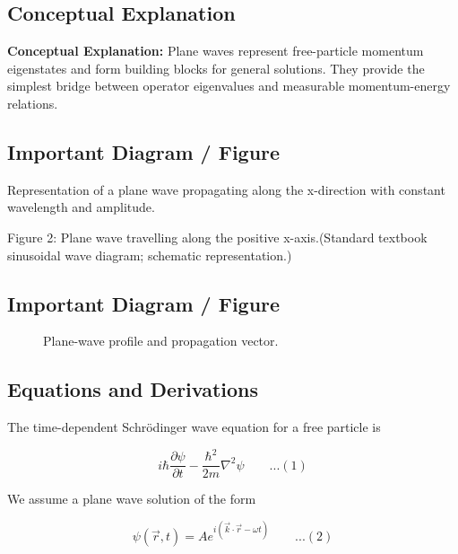 \documentclass[12pt]{report}
\begin{document}
\subsection{Conceptual Explanation}
\textbf{Conceptual Explanation:} Plane waves represent free-particle momentum eigenstates and form building blocks for general solutions. They provide the simplest bridge between operator eigenvalues and measurable momentum-energy relations.


\subsection*{Important Diagram / Figure}

Representation of a plane wave propagating along the x-direction with constant wavelength and amplitude.

Figure 2: Plane wave travelling along the positive x-axis.(Standard textbook sinusoidal wave diagram; schematic representation.)

\subsection*{Important Diagram / Figure}
\begin{figure}[H]
    \centering
    \caption{Plane-wave profile and propagation vector.}
\end{figure}

\subsection*{Equations and Derivations}

The time-dependent Schrödinger wave equation for a free particle is

\begin{equation*}
i\hbar \frac{\partial \psi}{\partial t}
-\frac{\hbar^2}{2m}\nabla^2 \psi\qquad ...(1)
\end{equation*}

We assume a plane wave solution of the form

\begin{equation*}
\psi(\vec{r},t) = A e^{i(\vec{k}\cdot\vec{r} - \omega t)} \qquad ...(2)
\end{equation*}
\end{document}
